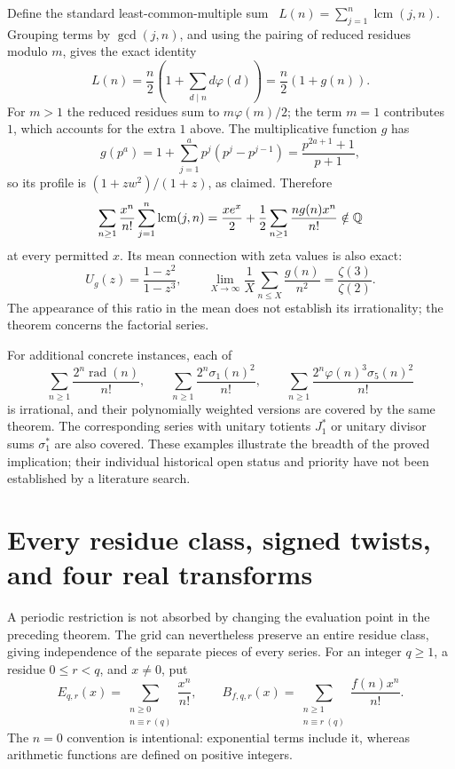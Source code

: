 Define the standard least-common-multiple sum~\cite{IM14}
$L(n)=\sum_{j=1}^{n}\operatorname{lcm}(j,n)$.  Grouping terms by
$\gcd(j,n)$, and using the pairing of reduced residues modulo $m$,
gives the exact identity
\begin{equation}\label{eq:lcm-sum-identity}
 L(n)=\frac n2\left(1+\sum_{d\mid n}d\varphi(d)\right)
          =\frac n2(1+g(n)).
\end{equation}
For $m>1$ the reduced residues sum to $m\varphi(m)/2$; the term
$m=1$ contributes $1$, which accounts for the extra $1$ above.
The multiplicative function $g$ has
\[
 g(p^a)=1+\sum_{j=1}^a p^j(p^j-p^{j-1})
        =\frac{p^{2a+1}+1}{p+1},
\]
so its profile is $(1+zw^2)/(1+z)$, as claimed.  Therefore
\begin{equation}\label{eq:lcm-constant}
 \sum_{n\geq1}\frac{x^n}{n!}
                  \sum_{j=1}^{n}\operatorname{lcm}(j,n)
       =\frac{x e^x}{2}+
          \frac12\sum_{n\geq1}\frac{n g(n)x^n}{n!}\notin\mathbb Q
\end{equation}
at every permitted $x$.  Its mean connection with zeta values is
also exact:
\[
 U_g(z)=\frac{1-z^2}{1-z^3},\qquad
 \lim_{X\to\infty}\frac1X\sum_{n\leq X}\frac{g(n)}{n^2}
        =\frac{\zeta(3)}{\zeta(2)}.
\]
The appearance of this ratio in the mean does not establish its
irrationality; the theorem concerns the factorial series.

For additional concrete instances, each of
\[
 \sum_{n\geq1}\frac{2^n\operatorname{rad}(n)}{n!},\qquad
 \sum_{n\geq1}\frac{2^n\sigma_1(n)^2}{n!},\qquad
 \sum_{n\geq1}\frac{2^n\varphi(n)^3\sigma_5(n)^2}{n!}
\]
is irrational, and their polynomially weighted versions are
covered by the same theorem.  The corresponding series with
unitary totients $J_1^*$ or unitary divisor sums $\sigma_1^*$ are
also covered.  These examples illustrate the breadth of the
proved implication; their individual historical open status and
priority have not been established by a literature search.


\section{Every residue class, signed twists, and four real transforms}
\label{sec:periodic}
A periodic restriction is not absorbed by changing the evaluation point
in the preceding theorem. The grid can nevertheless preserve an entire
residue class, giving independence of the separate pieces of every series.
For an integer $q\geq1$, a residue $0\leq r<q$, and $x\ne0$, put
\[
 E_{q,r}(x)=\sum_{\substack{n\geq0\\n\equiv r\ (q)}}\frac{x^n}{n!},
 \qquad
 B_{f,q,r}(x)=\sum_{\substack{n\geq1\\n\equiv r\ (q)}}
                       \frac{f(n)x^n}{n!}.
\]
The $n=0$ convention is intentional: exponential terms include it,
whereas arithmetic functions are defined on positive integers.

